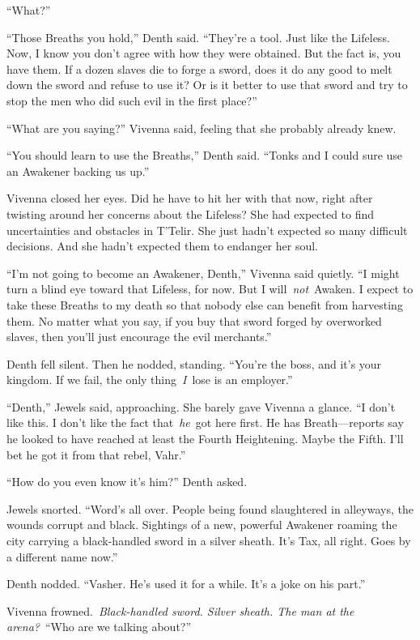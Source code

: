 “What?”

“Those Breaths you hold,” Denth said. “They’re a tool. Just like the Lifeless. Now, I know you don’t agree with how they were obtained. But the fact is, you have them. If a dozen slaves die to forge a sword, does it do any good to melt down the sword and refuse to use it? Or is it better to use that sword and try to stop the men who did such evil in the first place?”

“What are you saying?” Vivenna said, feeling that she probably already knew.

“You should learn to use the Breaths,” Denth said. “Tonks and I could sure use an Awakener backing us up.”

Vivenna closed her eyes. Did he have to hit her with that now, right after twisting around her concerns about the Lifeless? She had expected to find uncertainties and obstacles in T’Telir. She just hadn’t expected so many difficult decisions. And she hadn’t expected them to endanger her soul.

“I’m not going to become an Awakener, Denth,” Vivenna said quietly. “I might turn a blind eye toward that Lifeless, for now. But I will~\textit{not}~Awaken. I expect to take these Breaths to my death so that nobody else can benefit from harvesting them. No matter what you say, if you buy that sword forged by overworked slaves, then you’ll just encourage the evil merchants.”

Denth fell silent. Then he nodded, standing. “You’re the boss, and it’s your kingdom. If we fail, the only thing~\textit{I}~lose is an employer.”

“Denth,” Jewels said, approaching. She barely gave Vivenna a glance. “I don’t like this. I don’t like the fact that~\textit{he}~got here first. He has Breath—reports say he looked to have reached at least the Fourth Heightening. Maybe the Fifth. I’ll bet he got it from that rebel, Vahr.”

“How do you even know it’s him?” Denth asked.

Jewels snorted. “Word’s all over. People being found slaughtered in alleyways, the wounds corrupt and black. Sightings of a new, powerful Awakener roaming the city carrying a black-handled sword in a silver sheath. It’s Tax, all right. Goes by a different name now.”

Denth nodded. “Vasher. He’s used it for a while. It’s a joke on his part.”

Vivenna frowned.~\textit{Black-handled sword. Silver sheath. The man at the arena?}~“Who are we talking about?”


